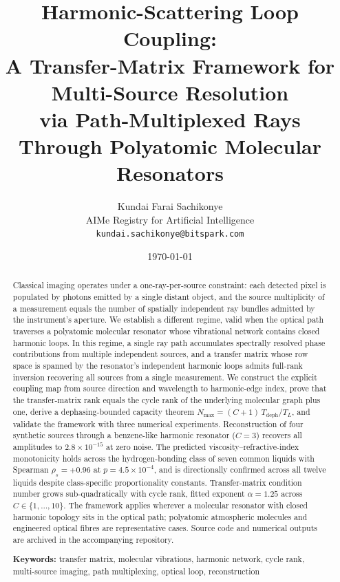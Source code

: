 \documentclass[11pt,twocolumn,a4paper]{article}
\title{\textbf{Harmonic-Scattering Loop Coupling: \\
A Transfer-Matrix Framework for Multi-Source Resolution \\
via Path-Multiplexed Rays Through Polyatomic Molecular Resonators}}
\author{
Kundai Farai Sachikonye\\
AIMe Registry for Artificial Intelligence\\
\texttt{kundai.sachikonye@bitspark.com}
}
\date{\today}
\theoremstyle{definition}
\theoremstyle{remark}
\begin{document}
\maketitle

\begin{abstract}
Classical imaging operates under a one-ray-per-source constraint: each detected pixel is populated by photons emitted by a single distant object, and the source multiplicity of a measurement equals the number of spatially independent ray bundles admitted by the instrument's aperture. We establish a different regime, valid when the optical path traverses a polyatomic molecular resonator whose vibrational network contains closed harmonic loops. In this regime, a single ray path accumulates spectrally resolved phase contributions from multiple independent sources, and a transfer matrix whose row space is spanned by the resonator's independent harmonic loops admits full-rank inversion recovering all sources from a single measurement. We construct the explicit coupling map from source direction and wavelength to harmonic-edge index, prove that the transfer-matrix rank equals the cycle rank of the underlying molecular graph plus one, derive a dephasing-bounded capacity theorem $N_{\max} = (C + 1)\, T_{\mathrm{deph}}/T_L$, and validate the framework with three numerical experiments. Reconstruction of four synthetic sources through a benzene-like harmonic resonator ($C = 3$) recovers all amplitudes to $2.8 \times 10^{-15}$ at zero noise. The predicted viscosity--refractive-index monotonicity holds across the hydrogen-bonding class of seven common liquids with Spearman $\rho_s = +0.96$ at $p = 4.5\times 10^{-4}$, and is directionally confirmed across all twelve liquids despite class-specific proportionality constants. Transfer-matrix condition number grows sub-quadratically with cycle rank, fitted exponent $\alpha = 1.25$ across $C \in \{1, \ldots, 10\}$. The framework applies wherever a molecular resonator with closed harmonic topology sits in the optical path; polyatomic atmospheric molecules and engineered optical fibres are representative cases. Source code and numerical outputs are archived in the accompanying repository.
\medskip

\noindent\textbf{Keywords:} transfer matrix, molecular vibrations, harmonic network, cycle rank, multi-source imaging, path multiplexing, optical loop, reconstruction
\end{abstract}

\end{document}
